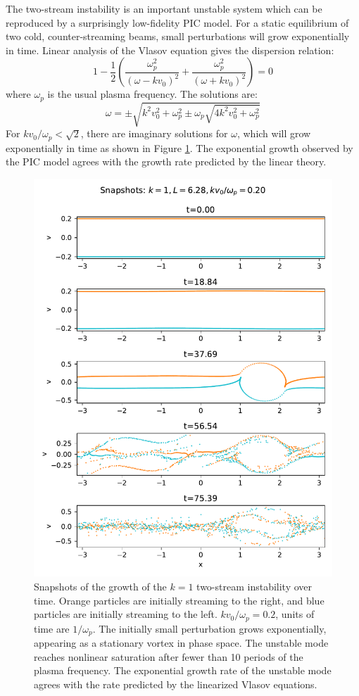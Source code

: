 \documentclass[%
 reprint,
 amsmath,amssymb,
 aps,
]{revtex4-2}
\begin{document}
The two-stream instability is an important unstable system which can be reproduced by a surprisingly low-fidelity PIC model. For a static equilibrium of two cold, counter-streaming beams, small perturbations will grow exponentially in time. Linear analysis of the Vlasov equation gives the dispersion relation:
\begin{equation}
1 - \frac{1}{2} \left( \frac{\omega_p ^2}{(\omega - k v_0)^2} + \frac{\omega_p ^2}{(\omega + k v_0)^2}\right) = 0
\end{equation}
where $\omega_p$ is the usual plasma frequency. The solutions are:
\begin{equation}
\omega = \pm \sqrt{k^2 v_0 ^2 + \omega_p ^2 \pm \omega_p \sqrt{4 k^2 v_0 ^2 + \omega_p ^2}}
\end{equation}
For $k v_0 / \omega_p < \sqrt{2}$, there are imaginary solutions for $\omega$, which will grow exponentially in time as shown in Figure \ref{fig:two-stream-k=1-snapshots}. The exponential growth observed by the PIC model agrees with the growth rate predicted by the linear theory.
\begin{figure}
\includegraphics[width=0.9\linewidth]{proj3/two-stream-k=1-snapshots.pdf}
\caption{\label{fig:two-stream-k=1-snapshots}Snapshots of the growth of the $k=1$ two-stream instability over time. Orange particles are initially streaming to the right, and blue particles are initially streaming to the left. $k v_0 / \omega_p = 0.2$, units of time are $1/\omega_p$. The initially small perturbation grows exponentially, appearing as a stationary vortex in phase space. The unstable mode reaches nonlinear saturation after fewer than 10 periods of the plasma frequency. The exponential growth rate of the unstable mode agrees with the rate predicted by the linearized Vlasov equations.}
\end{figure}
\end{document}
